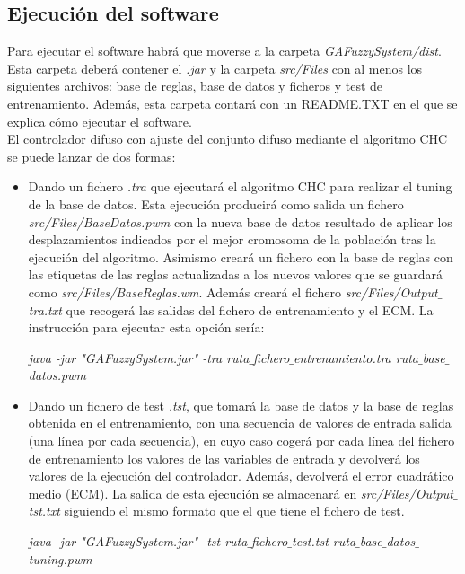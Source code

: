\documentclass[12pt,a4paper]{article}
\begin{document}
\subsection{Ejecución del software}
Para ejecutar el software habrá que moverse a la carpeta \textit{GAFuzzySystem/dist}. Esta carpeta deberá contener el \textit{.jar} y la carpeta \textit{src/Files} con al menos los siguientes archivos: base de reglas, base de datos y ficheros y test de entrenamiento. Además, esta carpeta contará con un README.TXT en el que se explica cómo ejecutar el software.\\
El controlador difuso con ajuste del conjunto difuso mediante el algoritmo CHC se puede lanzar de dos formas:
\begin{itemize}
\item Dando un fichero \textit{.tra} que ejecutará el algoritmo CHC para realizar el tuning de la base de datos.
Esta ejecución producirá como salida un fichero \textit{src/Files/BaseDatos.pwm} con la nueva base de datos resultado de aplicar los desplazamientos indicados por el mejor cromosoma de la población tras la ejecución del algoritmo. Asimismo creará un fichero con la base de reglas con las etiquetas de las reglas actualizadas a los nuevos valores que se guardará como \textit{src/Files/BaseReglas.wm}. Además creará el fichero \textit{src/Files/Output$\_$tra.txt} que recogerá las salidas del fichero de entrenamiento y el ECM. La instrucción para ejecutar esta opción sería:
\begin{center}
\textit{java -jar "GAFuzzySystem.jar" -tra ruta$\_$fichero$\_$entrenamiento.tra ruta$\_$base$\_$datos.pwm}
\end{center}
\item Dando un fichero de test \textit{.tst}, que tomará la base de datos y la base de reglas obtenida en el entrenamiento, con una secuencia de valores de entrada salida (una línea por cada secuencia), en cuyo caso cogerá por cada línea del fichero de entrenamiento los valores de las variables de entrada y devolverá los valores de la ejecución del controlador. Además, devolverá el error cuadrático medio (ECM). La salida de esta ejecución se almacenará en \textit{src/Files/Output$\_$tst.txt} siguiendo el mismo formato que el que tiene el fichero de test. 
\begin{center}
\textit{java -jar "GAFuzzySystem.jar" -tst ruta$\_$fichero$\_$test.tst ruta$\_$base$\_$datos$\_$tuning.pwm}
\end{center}
\end{itemize}
\end{document}
